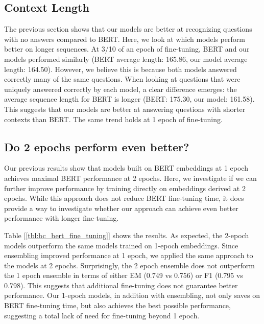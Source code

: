 \subsection{Context Length}

The previous section shows that our models are better at recognizing questions with no answers compared to BERT. Here, we look at which models perform better on longer sequences. At 3/10 of an epoch of fine-tuning, BERT and our models performed similarly (BERT average length: 165.86, our model average length: 164.50). However, we believe this is because both models answered correctly many of the same questions. When looking at questions that were uniquely answered correctly by each model, a clear difference emerges: the average sequence length for BERT is longer (BERT: 175.30, our model: 161.58). This suggests that our models are better at answering questions with shorter contexts than BERT. The same trend holds at 1 epoch of fine-tuning.

\subsection{Do 2 epochs perform even better?}
	
Our previous results show that models built on BERT embeddings at 1 epoch achieves maximal BERT performance at 2 epochs. Here, we investigate if we can further improve performance by training directly on embeddings derived at 2 epochs. While this approach does not reduce BERT fine-tuning time, it does provide a way to investigate whether our approach can achieve even better performance with longer fine-tuning. 
	
Table [\ref{tbl:bc_bert_fine_tuning}] shows the results. As expected, the 2-epoch models outperform the same models trained on 1-epoch embeddings. Since ensembling improved performance at 1 epoch, we applied the same approach to the models at 2 epochs. Surprisingly, the 2 epoch ensemble does not outperform the 1 epoch ensemble in terms of either EM (0.749 vs 0.756) or F1 (0.795 vs 0.798). This suggests that additional fine-tuning does not guarantee better performance. Our 1-epoch models, in addition with ensembling, not only saves on BERT fine-tuning time, but also achieves the best possible performance, suggesting a total lack of need for fine-tuning beyond 1 epoch.

